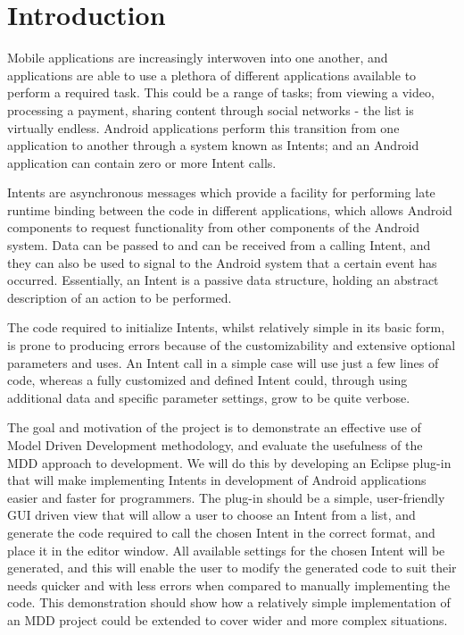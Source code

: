 \section{Introduction}

Mobile applications are increasingly interwoven into one another, and applications are able to use a plethora of different applications available to perform a required task. This could be a range of tasks; from viewing a video, processing a payment, sharing content through social networks - the list is virtually endless. Android applications perform this transition from one application to another through a system known as Intents; and an Android application can contain zero or more Intent calls.

Intents are asynchronous messages which provide a facility for performing late runtime binding between the code in different applications, which allows Android components to request functionality from other components of the Android system. Data can be passed to and can be received from a calling Intent, and they can also be used to signal to the Android system that a certain event has occurred. Essentially, an Intent is a passive data structure, holding an abstract description of an action to be performed. 

The code required to initialize Intents, whilst relatively simple in its basic form, is prone to producing errors because of the customizability and extensive optional parameters and uses. An Intent call in a simple case will use just a few lines of code, whereas a fully customized and defined Intent could, through using additional data and specific parameter settings, grow to be quite verbose. 

The goal and motivation of the project is to demonstrate an effective use of Model Driven Development methodology, and evaluate the usefulness of the MDD approach to development. We will do this by developing an Eclipse plug-in that will make implementing Intents in development of Android applications easier and faster for programmers. The plug-in should be a simple, user-friendly GUI driven view that will allow a user to choose an Intent from a list, and generate the code required to call the chosen Intent in the correct format, and place it in the editor window. All available settings for the chosen Intent will be generated, and this will enable the user to modify the generated code to suit their needs quicker and with less errors when compared to manually implementing the code. This demonstration should show how a relatively simple implementation of an MDD project could be extended to cover wider and more complex situations.

